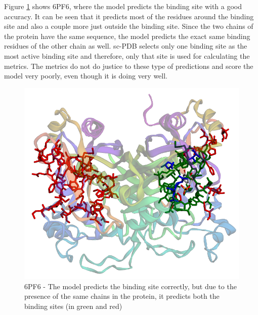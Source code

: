 \documentclass[journal=jacsat,manuscript=article]{achemso}
\begin{document}
Figure \ref{fig:6pf6} shows 6PF6\cite{czyzyk2019structure}, where the model predicts the binding site with a good accuracy. It can be seen that it predicts most of the residues around the binding site and also a couple more just outside the binding site. Since the two chains of the protein have the same sequence, the model predicts the exact same binding residues of the other chain as well. sc-PDB selects only one binding site as the most active binding site and therefore, only that site is used for calculating the metrics. The metrics do not do justice to these type of predictions and score the model very poorly, even though it is doing very well.
\begin{figure}
    \centering
    \noindent\includegraphics[scale=0.4]{6pf6.png}
    \caption{\centering 6PF6 - The model predicts the binding site correctly, but due to the presence of the same chains in the protein, it predicts both the binding sites (in green and red)}
    \label{fig:6pf6}
\end{figure}
\end{document}
